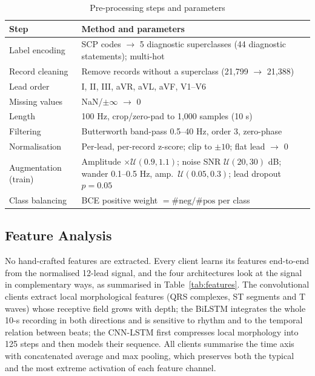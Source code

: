 \begin{table}[!t]
\centering
\caption{Pre-processing steps and parameters}
\label{tab:prep}
\footnotesize
\begin{tabular}{@{}p{2.1cm}p{5.9cm}@{}}
\toprule
Step & Method and parameters \\
\midrule
Label encoding & SCP codes $\rightarrow$ 5 diagnostic superclasses (44 diagnostic statements); multi-hot \\
Record cleaning & Remove records without a superclass (21,799 $\rightarrow$ 21,388) \\
Lead order & I, II, III, aVR, aVL, aVF, V1--V6 \\
Missing values & NaN/$\pm\infty$ $\rightarrow$ 0 \\
Length & 100 Hz, crop/zero-pad to 1,000 samples (10 s) \\
Filtering & Butterworth band-pass 0.5--40 Hz, order 3, zero-phase \\
Normalisation & Per-lead, per-record z-score; clip to $\pm10$; flat lead $\rightarrow$ 0 \\
Augmentation (train) & Amplitude $\times\mathcal{U}(0.9,1.1)$; noise SNR $\mathcal{U}(20,30)$ dB; wander 0.1--0.5 Hz, amp.\ $\mathcal{U}(0.05,0.3)$; lead dropout $p=0.05$ \\
Class balancing & BCE positive weight $=\#\text{neg}/\#\text{pos}$ per class \\
\bottomrule
\end{tabular}
\end{table}

\subsection{Feature Analysis}
\label{sec:features}

No hand-crafted features are extracted. Every client learns its features end-to-end from the
normalised 12-lead signal, and the four architectures look at the signal in complementary ways, as
summarised in Table~\ref{tab:features}. The convolutional clients extract local morphological
features (QRS complexes, ST segments and T waves) whose receptive field grows with depth; the BiLSTM
integrates the whole 10-s recording in both directions and is sensitive to rhythm and to the
temporal relation between beats; the CNN-LSTM first compresses local morphology into 125 steps and
then models their sequence. All clients summarise the time axis with concatenated average and max
pooling, which preserves both the typical and the most extreme activation of each feature channel.

